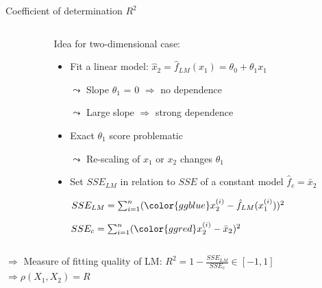 \documentclass[11pt,compress,t,notes=noshow, aspectratio=169, xcolor=table]{beamer}
\begin{document}
\begin{frame}{Coefficient of determination $R^2$}
\begin{columns}[c, totalwidth=\textwidth]
\begin{column}{0.5\linewidth}
\end{column}
\begin{column}{0.5\linewidth}

\medskip

Idea for two-dimensional case:
\begin{itemize}
    \setlength\itemsep{0.7mm}
    \item Fit a linear model:
    $\hat{x}_2 = \hat{f}_{LM}(x_1) = \theta_0 + \theta_1 x_1$
    \item[$\leadsto$] Slope $\theta_1$ = $0$ $\Rightarrow$ no dependence
    \item[$\leadsto$] Large slope $\Rightarrow$ strong dependence
        \pause
    \item Exact $\theta_1$ score problematic 
    \item[$\leadsto$] Re-scaling of $x_1$ or $x_2$ changes $\theta_1$ 
    \pause
    \item Set $SSE_{LM}$ in relation to $SSE$ of a constant model $\hat{f}_c = \bar{x}_2$
    \item[] $SSE_{LM} = \sum_{i=1}^n ({\color{ggblue}x_2^{(i)} - \hat{f}_{LM}(x_1^{(i)})})^2$
    \item[] $SSE_{c} = \sum_{i=1}^n ({\color{ggred}x_2^{(i)} - \bar{x}_2})^2$
\end{itemize}

\end{column}
\end{columns}

\medskip

$\Rightarrow$ Measure of fitting quality of LM: $R^2 = 1-\frac{SSE_{LM}}{SSE_{c}} \in [-1, 1]$ \\
$\Rightarrow \rho(X_1, X_2) = R$

\end{frame}
\end{document}
